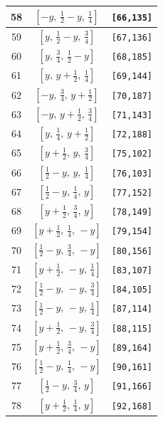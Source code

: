 \documentclass[fleqn,8pt]{jsarticle}
\begin{document}
\begin{longtable}{ccc}
58 & $\left[ - y,\, \frac{1}{2} - y,\, \frac{1}{4} \right]$ & {\tt [66,135]} \\ \hline
59 & $\left[ y,\, \frac{1}{2} - y,\, \frac{3}{4} \right]$ & {\tt [67,136]} \\ \hline
60 & $\left[ y,\, \frac{3}{4},\, \frac{1}{2} - y \right]$ & {\tt [68,185]} \\ \hline
61 & $\left[ y,\, y + \frac{1}{2},\, \frac{1}{4} \right]$ & {\tt [69,144]} \\ \hline
62 & $\left[ - y,\, \frac{3}{4},\, y + \frac{1}{2} \right]$ & {\tt [70,187]} \\ \hline
63 & $\left[ - y,\, y + \frac{1}{2},\, \frac{3}{4} \right]$ & {\tt [71,143]} \\ \hline
64 & $\left[ y,\, \frac{1}{4},\, y + \frac{1}{2} \right]$ & {\tt [72,188]} \\ \hline
65 & $\left[ y + \frac{1}{2},\, y,\, \frac{3}{4} \right]$ & {\tt [75,102]} \\ \hline
66 & $\left[ \frac{1}{2} - y,\, y,\, \frac{1}{4} \right]$ & {\tt [76,103]} \\ \hline
67 & $\left[ \frac{1}{2} - y,\, \frac{1}{4},\, y \right]$ & {\tt [77,152]} \\ \hline
68 & $\left[ y + \frac{1}{2},\, \frac{3}{4},\, y \right]$ & {\tt [78,149]} \\ \hline
69 & $\left[ y + \frac{1}{2},\, \frac{1}{4},\, - y \right]$ & {\tt [79,154]} \\ \hline
70 & $\left[ \frac{1}{2} - y,\, \frac{3}{4},\, - y \right]$ & {\tt [80,156]} \\ \hline
71 & $\left[ y + \frac{1}{2},\, - y,\, \frac{1}{4} \right]$ & {\tt [83,107]} \\ \hline
72 & $\left[ \frac{1}{2} - y,\, - y,\, \frac{3}{4} \right]$ & {\tt [84,105]} \\ \hline
73 & $\left[ \frac{1}{2} - y,\, - y,\, \frac{1}{4} \right]$ & {\tt [87,114]} \\ \hline
74 & $\left[ y + \frac{1}{2},\, - y,\, \frac{3}{4} \right]$ & {\tt [88,115]} \\ \hline
75 & $\left[ y + \frac{1}{2},\, \frac{3}{4},\, - y \right]$ & {\tt [89,164]} \\ \hline
76 & $\left[ \frac{1}{2} - y,\, \frac{1}{4},\, - y \right]$ & {\tt [90,161]} \\ \hline
77 & $\left[ \frac{1}{2} - y,\, \frac{3}{4},\, y \right]$ & {\tt [91,166]} \\ \hline
78 & $\left[ y + \frac{1}{2},\, \frac{1}{4},\, y \right]$ & {\tt [92,168]} \\ \hline

\end{longtable}
\end{document}
